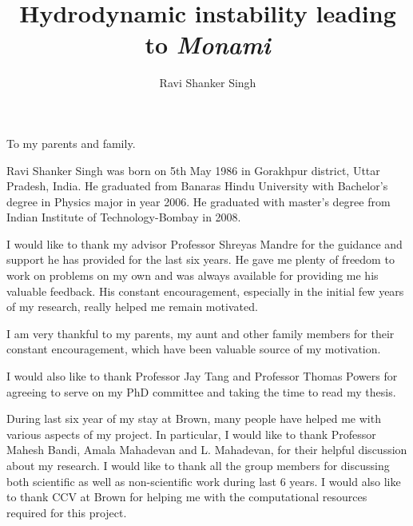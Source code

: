 \documentclass[12pt]{report}   %
\title{
Hydrodynamic instability leading to \textit{Monami}
}
\author{Ravi Shanker Singh}
\begin{document}
\doublespacing
\begin{preliminaries}
\maketitle

\copyrightpage

\begin{signature}
\end{signature}

\newpage
\vspace*{\fill}
\begin{center}
To my parents and family.
\end{center}
\vspace*{\fill}
\newpage

\begin{vita}
  Ravi Shanker Singh was born on 5th May 1986 in Gorakhpur district, Uttar Pradesh, India. He graduated from Banaras Hindu University with Bachelor's degree in Physics major in year 2006. He graduated with master's degree from Indian Institute of Technology-Bombay in 2008.
\end{vita}

\begin{acknowledgments}
 I would like to thank my advisor Professor Shreyas Mandre for the guidance and
support he has provided for the last six years. He gave me plenty of freedom to work on problems on my own and was always available for 
providing me his valuable feedback. His constant encouragement,
especially in the initial few years of my research, really helped me remain motivated.

I am very thankful to my parents, my aunt and other family members for their constant encouragement, which have been valuable source of my motivation.

I would also like to thank Professor Jay Tang and Professor Thomas Powers for agreeing to serve on my
PhD committee and taking the time to read my thesis.


During last six year of my stay at Brown, many people have helped me with various aspects of my project. In particular, I would like to thank Professor Mahesh Bandi, Amala Mahadevan and L. Mahadevan, for their helpful discussion about my research. I would like to thank all the group members for discussing both scientific as well as non-scientific work during last 6 years. I would also like to thank CCV at Brown for helping me with the computational resources required for this project.


\end{acknowledgments}
\end{preliminaries}
\end{document}
